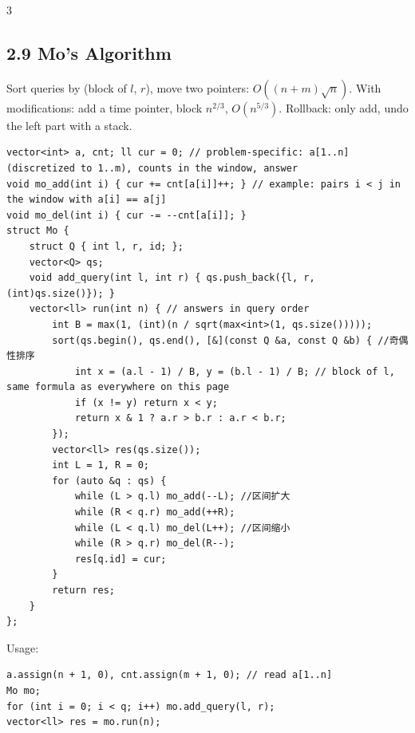 \documentclass[8pt]{extarticle}
\begin{document}
\begin{multicols*}{3}
\subsection*{2.9 Mo's Algorithm}

Sort queries by (block of $l$, $r$), move two pointers: $O((n + m)\sqrt n)$. With modifications: add a time pointer, block $n^{2/3}$, $O(n^{5/3})$. Rollback: only add, undo the left part with a stack.

\begin{lstlisting}
vector<int> a, cnt; ll cur = 0; // problem-specific: a[1..n] (discretized to 1..m), counts in the window, answer
void mo_add(int i) { cur += cnt[a[i]]++; } // example: pairs i < j in the window with a[i] == a[j]
void mo_del(int i) { cur -= --cnt[a[i]]; }
struct Mo {
    struct Q { int l, r, id; };
    vector<Q> qs;
    void add_query(int l, int r) { qs.push_back({l, r, (int)qs.size()}); }
    vector<ll> run(int n) { // answers in query order
        int B = max(1, (int)(n / sqrt(max<int>(1, qs.size()))));
        sort(qs.begin(), qs.end(), [&](const Q &a, const Q &b) { //奇偶性排序
            int x = (a.l - 1) / B, y = (b.l - 1) / B; // block of l, same formula as everywhere on this page
            if (x != y) return x < y;
            return x & 1 ? a.r > b.r : a.r < b.r;
        });
        vector<ll> res(qs.size());
        int L = 1, R = 0;
        for (auto &q : qs) {
            while (L > q.l) mo_add(--L); //区间扩大
            while (R < q.r) mo_add(++R);
            while (L < q.l) mo_del(L++); //区间缩小
            while (R > q.r) mo_del(R--);
            res[q.id] = cur;
        }
        return res;
    }
};
\end{lstlisting}

Usage:

\begin{lstlisting}
a.assign(n + 1, 0), cnt.assign(m + 1, 0); // read a[1..n]
Mo mo;
for (int i = 0; i < q; i++) mo.add_query(l, r);
vector<ll> res = mo.run(n);
\end{lstlisting}


\end{multicols*}
\end{document}
